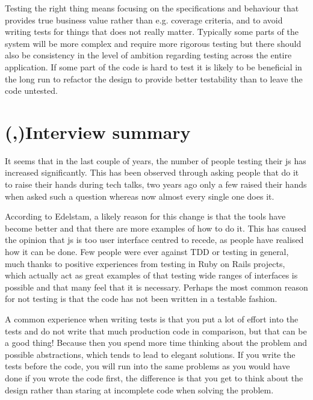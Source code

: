 \documentclass[11pt]{article}
\begin{document}
Testing the right thing means focusing on the specifications and behaviour that provides true business value rather than e.g. coverage criteria, and to avoid writing tests for things that does not really matter. Typically some parts of the system will be more complex and require more rigorous testing but there should also be consistency in the level of ambition regarding testing across the entire application. If some part of the code is hard to test it is likely to be beneficial in the long run to refactor the design to provide better testability than to leave the code untested.


\section{(,)Interview summary}

It seems that in the last couple of years, the number of people testing their \gls{js} has increased significantly\cite[question~1]{Edelstam}. This has been observed through asking people that do it to raise their hands during tech talks, two years ago only a few raised their hands when asked such a question whereas now almost every single one does it.

According to Edelstam, a likely reason for this change is that the tools have become better and that there are more examples of how to do it. This has caused the opinion that \gls{js} is too user interface centred to recede, as people have realised how it can be done. Few people were ever against TDD or testing in general, much thanks to positive experiences from testing in Ruby on Rails projects, which actually act as great examples of that testing wide ranges of interfaces is possible and that many feel that it is necessary. Perhaps the most common reason for not testing is that the code has not been written in a testable fashion. \cite[questions~2-3]{Edelstam}

A common experience when writing tests is that you put a lot of effort into the tests and do not write that much production code in comparison, but that can be a good thing! Because then you spend more time thinking about the problem and possible abstractions, which tends to lead to elegant solutions. If you write the tests before the code, you will run into the same problems as you would have done if you wrote the code first, the difference is that you get to think about the design rather than staring at incomplete code when solving the problem. \cite[question~8]{Edelstam}
\end{document}
